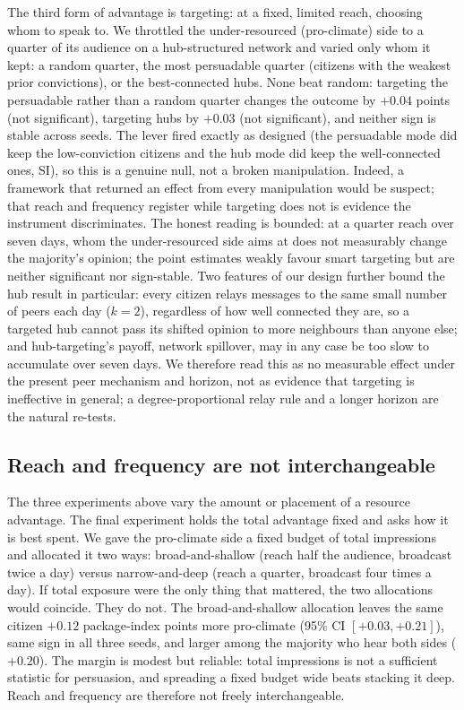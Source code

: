 \documentclass[pdflatex,sn-mathphys-num]{sn-jnl}%
\theoremstyle{thmstyleone}%
\theoremstyle{thmstyletwo}%
\theoremstyle{thmstylethree}%
\begin{document}
The third form of advantage is targeting: at a fixed, limited reach, choosing
whom to speak to. We throttled the under-resourced (pro-climate) side to a
quarter of its audience on a hub-structured network and varied only whom it kept: a
random quarter, the most persuadable quarter (citizens with the weakest prior
convictions), or the best-connected hubs. None beat random: targeting the persuadable
rather than a random quarter changes the outcome by $+0.04$ points (not significant),
targeting hubs by $+0.03$ (not significant), and neither sign is stable across seeds.
The lever fired exactly as designed (the persuadable mode did keep the low-conviction
citizens and the hub mode did keep the well-connected ones, SI), so this is a genuine
null, not a broken manipulation. Indeed, a framework that returned an effect from
every manipulation would be suspect; that reach and frequency register while
targeting does not is evidence the instrument discriminates. The honest reading is
bounded: at a quarter reach over seven days, whom the under-resourced side aims at does
not measurably change the majority's opinion; the point estimates weakly favour smart
targeting but are neither significant nor sign-stable. Two features of our design further
bound the hub result in particular: every citizen relays messages to the same small
number of peers each day ($k=2$), regardless of how well connected they are, so a
targeted hub cannot pass its shifted opinion to more neighbours than anyone else; and
hub-targeting's payoff, network spillover, may in any case be too slow to accumulate
over seven days. We therefore read this as no measurable effect under the present peer
mechanism and horizon, not as evidence that targeting is ineffective in general; a
degree-proportional relay rule and a longer horizon are the natural re-tests.

\subsection{Reach and frequency are not interchangeable}\label{subsec:bite-iso}

The three experiments above vary the amount or placement of a resource advantage. The final
experiment holds the total advantage fixed and asks how it is best spent. We gave the
pro-climate side a fixed budget of total impressions and allocated it two ways:
broad-and-shallow (reach half the audience, broadcast twice a day) versus
narrow-and-deep (reach a quarter, broadcast four times a day). If total exposure were
the only thing that mattered, the two allocations would coincide. They do not. The
broad-and-shallow allocation leaves the same citizen $+0.12$ package-index points more
pro-climate (95\% CI $[+0.03, +0.21]$), same sign in all three seeds, and larger among
the majority who hear both sides ($+0.20$). The margin is modest but reliable: total
impressions is not a sufficient statistic for persuasion, and spreading a fixed
budget wide beats stacking it deep. Reach and frequency are therefore not freely
interchangeable.
\end{document}
